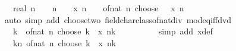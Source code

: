 \begin{isabellebody}
\ {\isachardoublequoteopen}{}\ {\isacharplus}{\kern0pt}\ {\isacharparenleft}{\kern0pt}real\ {\isacharparenleft}{\kern0pt}n\ {\isacharminus}{\kern0pt}\ {}{\isacharparenright}{\kern0pt}\ {\isacharasterisk}{\kern0pt}\ n{\isacharparenright}{\kern0pt}\ {\isacharslash}{\kern0pt}\ {}\ {\isacharasterisk}{\kern0pt}\ {\isacharparenleft}{\kern0pt}x\ n{\isacharparenright}{\kern0pt}\ {\isacharequal}{\kern0pt}\ {}\ {\isacharplus}{\kern0pt}\ of{\isacharunderscore}{\kern0pt}nat\ {\isacharparenleft}{\kern0pt}n\ choose\ {}{\isacharparenright}{\kern0pt}\ {\isacharasterisk}{\kern0pt}\ {\isacharparenleft}{\kern0pt}x\ n{\isacharparenright}{\kern0pt}\isanewline
\ \ \ \ \ \ \ \ \isamarkupfalse%
\ {\isacharparenleft}{\kern0pt}auto\ simp\ add{\isacharcolon}{\kern0pt}\ choose{\isacharunderscore}{\kern0pt}two\ field{\isacharunderscore}{\kern0pt}char{\isacharunderscore}{\kern0pt}{}{\isacharunderscore}{\kern0pt}class{\isachardot}{\kern0pt}of{\isacharunderscore}{\kern0pt}nat{\isacharunderscore}{\kern0pt}div\ mod{\isacharunderscore}{\kern0pt}eq{\isacharunderscore}{\kern0pt}{}{\isacharunderscore}{\kern0pt}iff{\isacharunderscore}{\kern0pt}dvd{\isacharparenright}{\kern0pt}\isanewline
\ \ \ \ \ \ \isamarkupfalse%
\ \isamarkupfalse%
\ {\isachardoublequoteopen}{\isasymdots}\ {\isasymle}\ {\isacharparenleft}{\kern0pt}{\isasymSum}k{\isasymin}{\isacharbraceleft}{\kern0pt}{}{\isacharcomma}{\kern0pt}\ {}{\isacharbraceright}{\kern0pt}{\isachardot}{\kern0pt}\ of{\isacharunderscore}{\kern0pt}nat\ {\isacharparenleft}{\kern0pt}n\ choose\ k{\isacharparenright}{\kern0pt}\ {\isacharasterisk}{\kern0pt}\ x\ n{\isacharcircum}{\kern0pt}k{\isacharparenright}{\kern0pt}{\isachardoublequoteclose}\isanewline
\ \ \ \ \ \ \ \ \isamarkupfalse%
\ {\isacharparenleft}{\kern0pt}simp\ add{\isacharcolon}{\kern0pt}\ x{\isacharunderscore}{\kern0pt}def{\isacharparenright}{\kern0pt}\isanewline
\ \ \ \ \ \ \isamarkupfalse%
\ \isamarkupfalse%
\ {\isachardoublequoteopen}{\isasymdots}\ {\isasymle}\ {\isacharparenleft}{\kern0pt}{\isasymSum}k{\isasymle}n{\isachardot}{\kern0pt}\ of{\isacharunderscore}{\kern0pt}nat\ {\isacharparenleft}{\kern0pt}n\ choose\ k{\isacharparenright}{\kern0pt}\ {\isacharasterisk}{\kern0pt}\ x\ n{\isacharcircum}{\kern0pt}k{\isacharparenright}{\kern0pt}{\isachardoublequoteclose}\isanewline
\ \ \ \ \ \ \ \ \isamarkupfalse%

\end{isabellebody}
